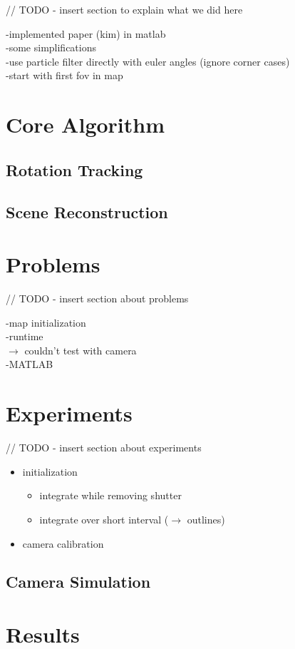 \documentclass[10pt,twocolumn,letterpaper]{article}
\begin{document}
// TODO - insert section to explain what we did here

-implemented paper (kim) in matlab\\
-some simplifications\\
	-use particle filter directly with euler angles (ignore corner cases)\\
	-start with first fov in map\\
	
\section{Core Algorithm}


\subsection{Rotation Tracking}


\subsection{Scene Reconstruction}


\section{Problems}
// TODO - insert section about problems

-map initialization\\
-runtime\\
$\rightarrow$ couldn't test with camera\\
-MATLAB\\


\section{Experiments}
// TODO - insert section about experiments

\begin{itemize}
\item initialization
\begin{itemize}
\item integrate while removing shutter
\item integrate over short interval ($\rightarrow$ outlines)
\end{itemize}
\item camera calibration
\end{itemize}



\subsection{Camera Simulation}


\section{Results}



{\small


}
\end{document}
